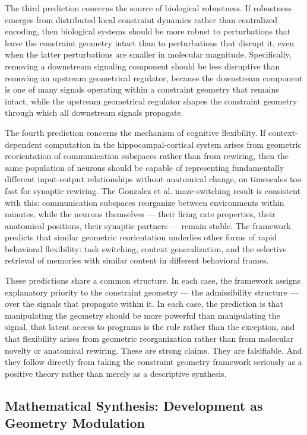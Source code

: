 \documentclass[12pt, a4paper, openany]{book}
\theoremstyle{definition}
\theoremstyle{remark}
\begin{document}
The third prediction concerns the source of biological robustness. If robustness emerges from distributed local constraint dynamics rather than centralized encoding, then biological systems should be more robust to perturbations that leave the constraint geometry intact than to perturbations that disrupt it, even when the latter perturbations are smaller in molecular magnitude. Specifically, removing a downstream signaling component should be less disruptive than removing an upstream geometrical regulator, because the downstream component is one of many signals operating within a constraint geometry that remains intact, while the upstream geometrical regulator shapes the constraint geometry through which all downstream signals propagate.

The fourth prediction concerns the mechanism of cognitive flexibility. If context-dependent computation in the hippocampal-cortical system arises from geometric reorientation of communication subspaces rather than from rewiring, then the same population of neurons should be capable of representing fundamentally different input-output relationships without anatomical change, on timescales too fast for synaptic rewiring. The Gonzalez et al. maze-switching result is consistent with this: communication subspaces reorganize between environments within minutes, while the neurons themselves — their firing rate properties, their anatomical positions, their synaptic partners — remain stable. The framework predicts that similar geometric reorientation underlies other forms of rapid behavioral flexibility: task switching, context generalization, and the selective retrieval of memories with similar content in different behavioral frames.

These predictions share a common structure. In each case, the framework assigns explanatory priority to the constraint geometry — the admissibility structure — over the signals that propagate within it. In each case, the prediction is that manipulating the geometry should be more powerful than manipulating the signal, that latent access to programs is the rule rather than the exception, and that flexibility arises from geometric reorganization rather than from molecular novelty or anatomical rewiring. These are strong claims. They are falsifiable. And they follow directly from taking the constraint geometry framework seriously as a positive theory rather than merely as a descriptive synthesis.

\subsection*{Mathematical Synthesis: Development as Geometry Modulation}
\end{document}
